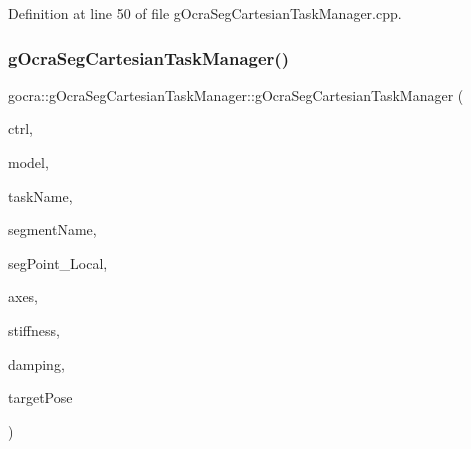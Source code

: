 Definition at line 50 of file g\+Ocra\+Seg\+Cartesian\+Task\+Manager.\+cpp.

\hypertarget{classgocra_1_1gOcraSegCartesianTaskManager_a14780eadde3c5c3c9d3d92b011e0003b}{}\label{classgocra_1_1gOcraSegCartesianTaskManager_a14780eadde3c5c3c9d3d92b011e0003b} 
\subsubsection{\texorpdfstring{g\+Ocra\+Seg\+Cartesian\+Task\+Manager()}{gOcraSegCartesianTaskManager()}\hspace{0.1cm}{\footnotesize\ttfamily [4/4]}}
{\footnotesize\ttfamily gocra\+::g\+Ocra\+Seg\+Cartesian\+Task\+Manager\+::g\+Ocra\+Seg\+Cartesian\+Task\+Manager (\begin{DoxyParamCaption}\item[{\hyperlink{classgocra_1_1GHCJTController}{G\+H\+C\+J\+T\+Controller} \&}]{ctrl,  }\item[{const ocra\+::\+Model \&}]{model,  }\item[{const std\+::string \&}]{task\+Name,  }\item[{const std\+::string \&}]{segment\+Name,  }\item[{const Eigen\+::\+Vector3d \&}]{seg\+Point\+\_\+\+Local,  }\item[{\hyperlink{namespaceocra_a436781c7059a0f76027df1c652126260}{ocra\+::\+E\+Cartesian\+Dof}}]{axes,  }\item[{double}]{stiffness,  }\item[{double}]{damping,  }\item[{const Eigen\+::\+Vector3d \&}]{target\+Pose }\end{DoxyParamCaption})}

\hypertarget{classgocra_1_1gOcraSegCartesianTaskManager_a859cbd42a2beb4eff0e68ee014d9009f}{}\label{classgocra_1_1gOcraSegCartesianTaskManager_a859cbd42a2beb4eff0e68ee014d9009f} 
